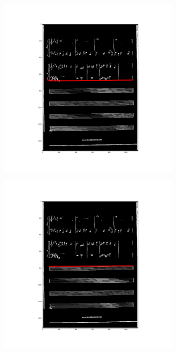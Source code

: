 \documentclass[12pt]{article}
\begin{document}
\begin{figure}[h!]
\begin{subfigure}[b]{0.32\linewidth}
		\end{subfigure}
		\begin{subfigure}[b]{0.32\linewidth}
			\includegraphics[width=\linewidth]{zdj/BFS20.png}
		\end{subfigure}
		\begin{subfigure}[b]{0.32\linewidth}
			\includegraphics[width=\linewidth]{zdj/BFS21.png}

\end{subfigure}
\end{figure}
\end{document}
